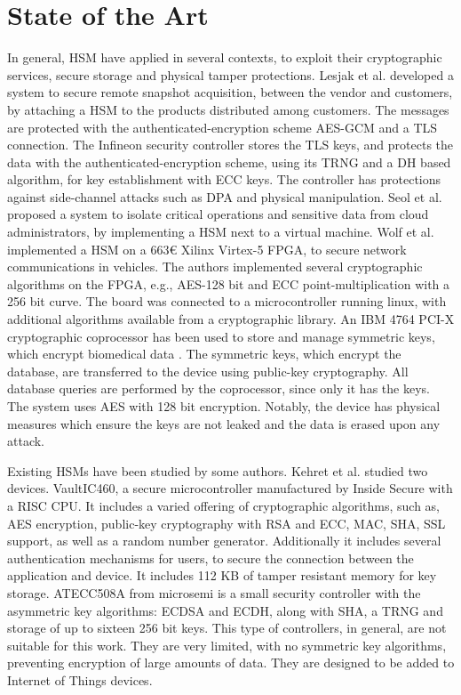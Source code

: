 \section{State of the Art}\label{chap:background:art}

In general, \ac{HSM} have applied in several contexts, to exploit their cryptographic services, secure storage and physical tamper protections.
Lesjak et al. \cite{iothardware} developed a system to secure remote snapshot acquisition, between the vendor and customers, by attaching a HSM to the products distributed among customers. 
The messages are protected with the authenticated-encryption scheme \ac{AES}-\ac{GCM} and a TLS connection.
The Infineon security controller stores the TLS keys, and protects the data with the authenticated-encryption scheme, using its TRNG and a \ac{DH} based algorithm, for key establishment with ECC keys. The controller has protections against side-channel attacks such as \ac{DPA} and physical manipulation.
Seol et al. \cite{trustediaashsm} proposed a system to isolate critical operations and sensitive data from cloud administrators, by implementing a \ac{HSM} next to a virtual machine.
Wolf et al. \cite{wolf2011design} implemented a HSM on a 663€ Xilinx Virtex-5 FPGA, to secure network communications in vehicles. The authors implemented several cryptographic algorithms on the FPGA, e.g., AES-128 bit and ECC point-multiplication with a 256 bit curve. The board was connected to a microcontroller running linux, with additional algorithms available from a cryptographic library.
An IBM 4764 PCI-X cryptographic coprocessor has been used to store and manage symmetric keys, which encrypt biomedical data \cite{canim2011biomedical}. The symmetric keys, which encrypt the database, are transferred to the device using public-key cryptography. All database queries are performed by the coprocessor, since only it has the keys. The system uses AES with 128 bit encryption. Notably, the device has physical measures which ensure the keys are not leaked and the data is erased upon any attack.

Existing \ac{HSM}s have been studied by some authors.
Kehret et al. \cite{tlsintegration} studied two devices. VaultIC460, a secure microcontroller manufactured by Inside Secure with a RISC CPU. It includes a varied offering of cryptographic algorithms, such as, AES encryption, public-key cryptography with RSA and ECC, MAC, SHA, SSL support, as well as a random number generator. Additionally it includes several authentication mechanisms for users, to secure the connection between the application and device.
It includes 112 KB of tamper resistant memory for key storage.
ATECC508A from microsemi is a small security controller with the asymmetric key algorithms: ECDSA and ECDH, along with SHA, a TRNG and storage of up to sixteen 256 bit keys.
This type of controllers, in general, are not suitable for this work. They are very limited, with no symmetric key algorithms, preventing encryption of large amounts of data. They are designed to be added to Internet of Things devices.

